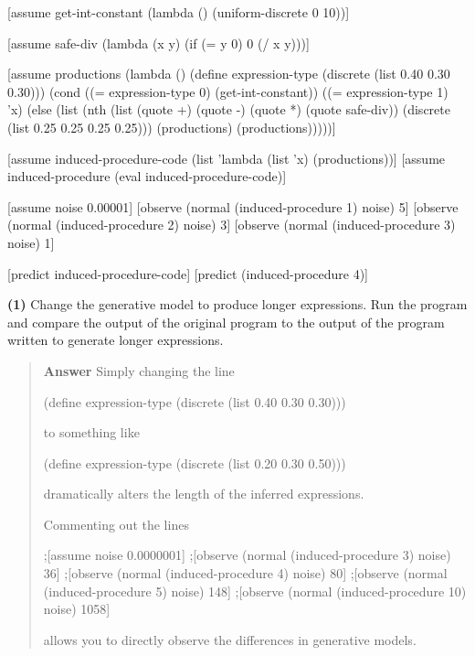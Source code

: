 \documentclass[11pt,reqno]{amsart}
\newif\ifanswers
\newcommand{\+}[1]{\ensuremath{{\mathbf{#1}}}}
\begin{document}
 \begin{code}{}{}
 [assume get-int-constant
  (lambda () (uniform-discrete 0 10))]

[assume safe-div 
  (lambda (x y) (if (= y 0) 0 (/ x y)))]

[assume productions 
  (lambda ()
    (define expression-type (discrete (list 0.40 0.30 0.30)))
      (cond
        ((= expression-type 0) (get-int-constant))
        ((= expression-type 1) 'x)
        (else
          (list
            (nth (list (quote +) (quote -) (quote *) (quote safe-div))
                 (discrete (list 0.25 0.25 0.25 0.25)))
              (productions) (productions)))))]

[assume induced-procedure-code (list 'lambda (list 'x) (productions))]
[assume induced-procedure (eval induced-procedure-code)]

[assume noise 0.00001]
[observe (normal (induced-procedure 1) noise) 5]
[observe (normal (induced-procedure 2) noise) 3]
[observe (normal (induced-procedure 3) noise) 1]

[predict induced-procedure-code]
[predict (induced-procedure 4)]
 \end{code} 



\vspace{.5cm}

\vspace{.5cm}

{\bf (1)} Change the generative model to produce longer expressions.  Run the program and compare the output of the original program to the output of the program written to generate longer expressions.

\ifanswers
\begin{quotation}
 {\bf Answer } Simply changing the line
 \begin{code}{}{}
     (define expression-type (discrete (list 0.40 0.30 0.30)))
 \end{code}
 to something like
 
\begin{code}{}{}
     (define expression-type (discrete (list 0.20 0.30 0.50)))
 \end{code}
 dramatically alters the length of the inferred expressions.
 
 Commenting out the lines
 
 \begin{code}{}{}
;[assume noise 0.0000001]
;[observe (normal (induced-procedure 3) noise) 36]
;[observe (normal (induced-procedure 4) noise) 80]
;[observe (normal (induced-procedure 5) noise) 148]
;[observe (normal (induced-procedure 10) noise) 1058]
 \end{code}
 
 allows you to directly observe the differences in generative models.
 
\end{quotation}
\end{document}
